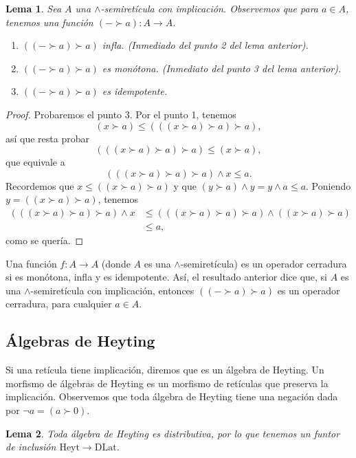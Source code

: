 \documentclass[12pt,letterpaper,titlepage]{article}
\newtheorem{lemma}{Lema}
\theoremstyle{definition}
\renewcommand\inf{\wedge}
\newcommand\<{\langle}
\renewcommand\>{\rangle}
\newcommand{\DLat}{\mathrm{DLat}}
\newcommand{\Heyt}{\mathrm{Heyt}}
\begin{document}
\begin{lemma}
  Sea $A$ una $\inf$-semiretícula con implicación.
  Observemos que para $a\in A$, tenemos
  una función $(-\succ a):A\to A$.
  \begin{enumerate}
    \item $((-\succ a)\succ a)$ infla.
    (Inmediado del punto 2 del lema anterior).
    \item $((-\succ a)\succ a)$ es monótona.
      (Inmediato del punto 3 del lema anterior).
    \item $((-\succ a)\succ a)$ es idempotente.
  \end{enumerate}
\end{lemma}
\begin{proof}
    Probaremos el punto 3.
    Por el punto 1, tenemos
    \[
      (x\succ a) \leq (((x\succ a)\succ a)\succ a),
    \]
    así que resta probar
    \[
       (((x\succ a)\succ a)\succ a) \leq (x\succ a),
    \]
    que equivale a
    \[
       (((x\succ a)\succ a)\succ a) \inf x \leq a.
    \]
    Recordemos que $x\leq ((x\succ a)\succ a)$ y que
    $(y\succ a)\inf y = y\inf a\leq a$.
    Poniendo $y=((x\succ a)\succ a)$, tenemos
    \begin{align*}
       (((x\succ a)\succ a)\succ a) \inf x
       &\leq  (((x\succ a)\succ a)\succ a) \inf ((x\succ a)\succ a) \\
       &\leq a,
    \end{align*}
    como se quería. 
\end{proof}

Una función $f:A\to A$ (donde $A$ es una $\inf$-semiretícula)
es un operador cerradura si es monótona, infla y es idempotente.
Así, el resultado anterior dice que, si $A$ es una
$\inf$-semiretícula con implicación,
entonces $((-\succ a)\succ a)$ es un
operador cerradura, para cualquier $a\in A$.

\subsection{Álgebras de Heyting}

Si una retícula tiene implicación, diremos que es un álgebra de
Heyting.
Un morfismo de álgebras de Heyting es un morfismo de retículas
que preserva la implicación.
Observemos que toda álgebra de Heyting tiene una
negación dada por $\neg a = (a\succ 0)$.

\begin{lemma}
  Toda álgebra de Heyting es distributiva, por lo que
  tenemos un funtor de inclusión $\Heyt\to\DLat$.
\end{lemma}
\end{document}
